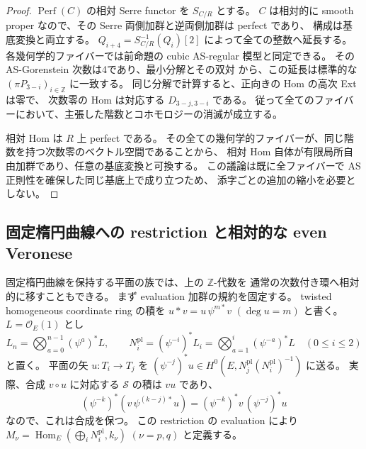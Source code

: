 \begin{proof}
$\operatorname{Perf}(C)$ の相対 Serre functor を $S_{C/R}$ とする。
$C$ は相対的に smooth proper なので、その Serre 両側加群と逆両側加群は perfect であり、
構成は基底変換と両立する。
$Q_{i+4}=S_{C/R}^{-1}(Q_i)[2]$ によって全ての整数へ延長する。
各幾何学的ファイバーでは前命題の cubic AS-regular 模型と同定できる。
その AS-Gorenstein 次数は4であり、最小分解とその双対
\cite[定理5.5.7]{VdBQuadrics} から、この延長は標準的な
$(\pi P_{3-i})_{i\in\mathbb Z}$ に一致する。
同じ分解で計算すると、正向きの Hom の高次 Ext は零で、
次数零の Hom は対応する $D_{3-j,3-i}$ である。
従って全てのファイバーにおいて、主張した階数とコホモロジーの消滅が成立する。

相対 Hom は $R$ 上 perfect である。
その全ての幾何学的ファイバーが、同じ階数を持つ次数零のベクトル空間であることから、
相対 Hom 自体が有限局所自由加群であり、任意の基底変換と可換する。
この議論は既に全ファイバーで AS 正則性を確保した同じ基底上で成り立つため、
添字ごとの追加の縮小を必要としない。
\end{proof}

\subsection{固定楕円曲線への restriction と相対的な even Veronese}

固定楕円曲線を保持する平面の族では、上の $\mathbb Z$-代数を
通常の次数付き環へ相対的に移すこともできる。
まず evaluation 加群の規約を固定する。
twisted homogeneous coordinate ring の積を
$u*v=u\,\psi^{m*}v$ $(\deg u=m)$ と書く。
$L=\mathcal O_E(1)$ とし
\[
 L_n=\bigotimes_{a=0}^{n-1}(\psi^a)^*L,\qquad
 N_i^{\mathrm{pl}}=(\psi^{-i})^*L_i
 =\bigotimes_{a=1}^{i}(\psi^{-a})^*L
 \quad (0\le i\le2)
\]
と置く。
平面の矢 $u:T_i\to T_j$ を
$(\psi^{-j})^*u\in H^0(E,N_j^{\mathrm{pl}}(N_i^{\mathrm{pl}})^{-1})$
に送る。
実際、合成 $v\circ u$ に対応する $\mathcal S$ の積は $vu$ であり、
\[
 (\psi^{-k})^*(v\,\psi^{(k-j)*}u)
 =(\psi^{-k})^*v\,(\psi^{-j})^*u
\]
なので、これは合成を保つ。
この restriction の evaluation により
$M_\nu=\operatorname{Hom}_E(\bigoplus_iN_i^{\mathrm{pl}},k_\nu)$
$(\nu=p,q)$ と定義する。

